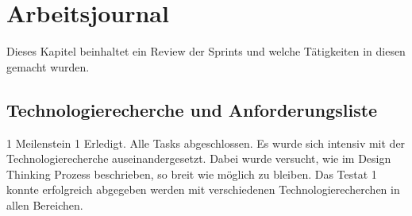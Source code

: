 \section{Arbeitsjournal}
\label{sec:arbeitsjournal-ref}
Dieses Kapitel beinhaltet ein Review der Sprints und welche Tätigkeiten 
in diesen gemacht wurden.

\subsection*{Technologierecherche und Anforderungsliste}
\workday
    {1}
    {\ok Meilenstein 1 Erledigt. Alle Tasks abgeschlossen.}
    {
      Es wurde sich intensiv mit der Technologierecherche auseinandergesetzt.
      Dabei wurde versucht, wie im Design Thinking Prozess beschrieben, so breit wie möglich
      zu bleiben.
    }
    {
      Das Testat 1 konnte erfolgreich abgegeben werden mit verschiedenen Technologierecherchen in
      allen Bereichen.
    }
